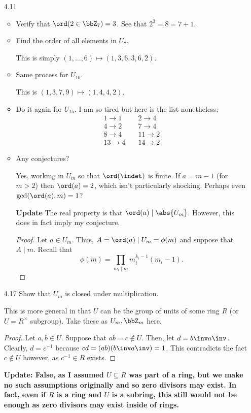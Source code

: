 \documentclass{article}
\begin{document}
\begin{enumerate}
  \item[4.11\rparen]
        \begin{itemize}
          \item Verify that $\ord(2 \in \bbZ_{7}) = 3$. See that $2^{3} = 8 = 7 + 1$.

          \item Find the order of all elements in $U_{7}$.

                This is simply $(1, \ldots, 6) \mapsto (1, 3, 6, 3, 6, 2)$.
          \item Same process for $U_{10}$.

                This is $(1, 3, 7, 9) \mapsto (1, 4, 4, 2)$.

          \item Do it again for $U_{15}$. I am so tired but here is the list nonetheless:
                \begin{align*}
                  1 \to 1 &\quad 2 \to 4\\
                  4 \to 2 &\quad 7 \to 4\\
                  8 \to 4 &\quad 11 \to 2\\
                  13 \to 4 &\quad 14 \to 2
                \end{align*}

          \item Any conjectures?

                Yes, working in $U_{m}$ so that $\ord(\indet)$ is finite.
                If $a = m - 1$ (for $m > 2$) then $\ord(a) = 2$, which isn't particularly shocking.
                Perhaps even $\gcd(\ord(a), m) = 1$?

                \textbf{Update} The real property is that $\ord(a) \mid \abs{U_{m}}$.
                However, this does in fact imply my conjecture.
                \begin{proof}
                  Let $a \in U_{m}$. Thus, $A = \ord(a) \mid U_{m} = \phi(m)$ and suppose that $A \mid m$.
                  Recall that
                  \[ \phi(m) = \prod_{m_{i} \mid m}m_{i}^{k_{i} - 1}(m_{i} - 1). \]
                \end{proof}
        \end{itemize}

  \item[4.17\rparen] Show that $U_{m}$ is closed under multiplication.

        This is more general in that $U$ can be the group of units of some ring $R$ (or $U = R^{\times}$ subgroup).
        Take these as $U_{m}, \bbZ_{m}$ here.
        \begin{proof}
          Let $a, b \in U$. Suppose that $ab = c \notin U$. Then, let $d = b\inv a\inv$.
          Clearly, $d = c^{-1}$ because $cd = (a b) (b\inv a\inv) = 1$.
          This contradicts the fact $c \notin U$ however, as $c^{-1} \in R$ exists.
        \end{proof}
        \textbf{Update: False, as I assumed $U \subseteq R$ was part of a ring, but we make no such assumptions originally and so zero divisors may exist.
        In fact, even if $R$ is a ring and $U$ is a subring, this still would not be enough as zero divisors may exist inside of rings.}


\end{enumerate}
\end{document}
